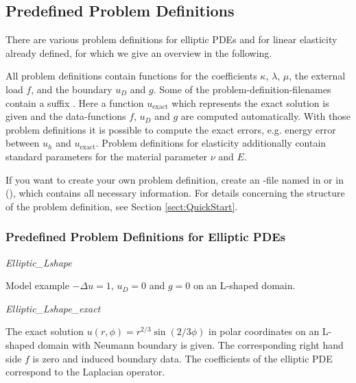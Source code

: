 \bigskip
\subsection{Predefined Problem Definitions}
\label{sect:ImplementedProblems_ProblemDefinition}

\noindent There are various problem definitions for elliptic PDEs and for linear elasticity already defined, for which we give an overview in the following.

\medskip

\noindent All problem definitions contain functions for the coefficients $\kappa$, $\lambda$, $\mu$, the external load $f$, and the boundary $u_D$ and $g$. Some of the problem-definition-filenames contain a suffix . Here a function $u_{\text{exact}}$ which represents the exact solution is given and the data-functions $f$, $u_D$ and $g$ are computed automatically. With those problem definitions it is possible to compute the exact errors, e.g. energy error between $u_h$ and $u_{\text{exact}}$. Problem definitions for elasticity additionally contain standard parameters for the material parameter $\nu$ and $E$.

\bigskip

\noindent If you want to create your own problem definition, create an -file named  in  or  in (), which contains all necessary information. For details concerning the structure of the problem definition, see Section \ref{sect:QuickStart}.

\bigskip

\subsubsection{Predefined Problem Definitions for Elliptic PDEs}$ $\\

\noindent\emph{Elliptic\_Lshape}

\smallskip

\noindent Model example $-\Delta u = 1$, $u_D=0$ and $g=0$ on an L-shaped domain.

\bigskip

\noindent\emph{Elliptic\_Lshape\_exact}

\smallskip

\noindent The exact solution $u(r,\phi)=r^{2/3}\sin(2/3\phi)$ in polar coordinates on an L-shaped domain with Neumann boundary is given. The corresponding right hand side $f$ is zero and induced boundary data. The coefficients of the elliptic PDE correspond to the Laplacian operator.
\bigskip

